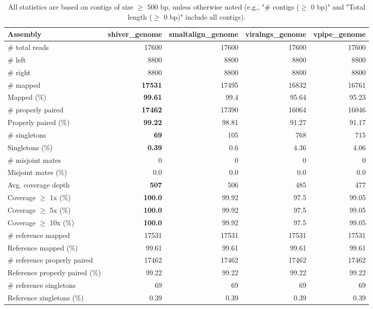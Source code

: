\documentclass[12pt,a4paper]{article}
\begin{document}
\begin{table}[ht]
\begin{center}
\caption{All statistics are based on contigs of size $\geq$ 500 bp, unless otherwise noted (e.g., "\# contigs ($\geq$ 0 bp)" and "Total length ($\geq$ 0 bp)" include all contigs).}
\begin{tabular}{|l*{4}{|r}|}
\hline
Assembly & shiver\_genome & smaltalign\_genome & viralngs\_genome & vpipe\_genome \\ \hline
\# total reads & 17600 & 17600 & 17600 & 17600 \\ \hline
\# left & 8800 & 8800 & 8800 & 8800 \\ \hline
\# right & 8800 & 8800 & 8800 & 8800 \\ \hline
\# mapped & {\bf 17531} & 17495 & 16832 & 16761 \\ \hline
Mapped (\%) & {\bf 99.61} & 99.4 & 95.64 & 95.23 \\ \hline
\# properly paired & {\bf 17462} & 17390 & 16064 & 16046 \\ \hline
Properly paired (\%) & {\bf 99.22} & 98.81 & 91.27 & 91.17 \\ \hline
\# singletons & {\bf 69} & 105 & 768 & 715 \\ \hline
Singletons (\%) & {\bf 0.39} & 0.6 & 4.36 & 4.06 \\ \hline
\# misjoint mates & 0 & 0 & 0 & 0 \\ \hline
Misjoint mates (\%) & 0.0 & 0.0 & 0.0 & 0.0 \\ \hline
Avg. coverage depth & {\bf 507} & 506 & 485 & 477 \\ \hline
Coverage $\geq$ 1x (\%) & {\bf 100.0} & 99.92 & 97.5 & 99.05 \\ \hline
Coverage $\geq$ 5x (\%) & {\bf 100.0} & 99.92 & 97.5 & 99.05 \\ \hline
Coverage $\geq$ 10x (\%) & {\bf 100.0} & 99.92 & 97.5 & 99.05 \\ \hline
\# reference mapped & 17531 & 17531 & 17531 & 17531 \\ \hline
Reference mapped (\%) & 99.61 & 99.61 & 99.61 & 99.61 \\ \hline
\# reference properly paired & 17462 & 17462 & 17462 & 17462 \\ \hline
Reference properly paired (\%) & 99.22 & 99.22 & 99.22 & 99.22 \\ \hline
\# reference singletons & 69 & 69 & 69 & 69 \\ \hline
Reference singletons (\%) & 0.39 & 0.39 & 0.39 & 0.39 \\ \hline

\end{tabular}
\end{center}
\end{table}
\end{document}
